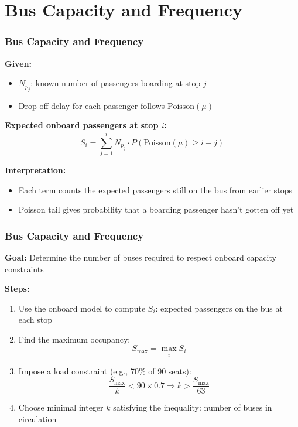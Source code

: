 \documentclass[12pt]{beamer}
\begin{document}
\section{Bus Capacity and Frequency}
\begin{frame}
\frametitle{Bus Capacity and Frequency}
\textbf{Given:}
\begin{itemize}
  \item $ N_{p_j}$: known number of passengers boarding at stop $j$
  \item Drop-off delay for each passenger follows $\text{Poisson}(\mu)$
\end{itemize}

\vspace{0.1cm}
\textbf{Expected onboard passengers at stop $i$:}
\begin{equation}
S_i = \sum_{j=1}^{i} N_{p_j} \cdot P(\text{Poisson}(\mu) \ge i - j)
\end{equation}

\vspace{0.1cm}
\textbf{Interpretation:}
\begin{itemize}
  \item Each term counts the expected passengers still on the bus from earlier stops
  \item Poisson tail gives probability that a boarding passenger hasn't gotten off yet
\end{itemize}
\end{frame}

\begin{frame}
\frametitle{Bus Capacity and Frequency}
\textbf{Goal:} Determine the number of buses required to respect onboard capacity constraints

\vspace{0.3cm}
\textbf{Steps:}
\begin{enumerate}
  \item Use the onboard model to compute $S_i$: expected passengers on the bus at each stop
  \item Find the maximum occupancy:
  \[
  S_{\text{max}} = \max_i S_i
  \]
  \item Impose a load constraint (e.g., 70\% of 90 seats):
  \begin{equation}
  \frac{S_{\text{max}}}{k} < 90 \times 0.7
  \Rightarrow
  k > \frac{S_{\text{max}}}{63}
  \end{equation}
  \item Choose minimal integer $k$ satisfying the inequality: number of buses in circulation
\end{enumerate}
\end{frame}
\end{document}

